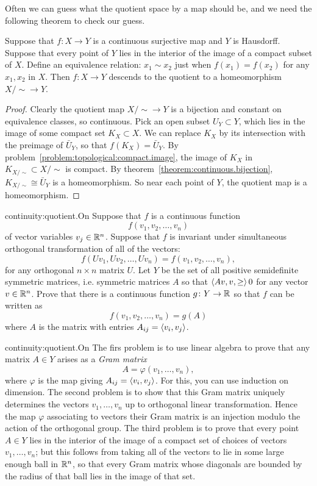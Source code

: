 Often we can guess what the quotient space by a map should be, and we need the following theorem to check our guess.
\begin{theorem}
Suppose that \(f \colon X \to Y\) is a continuous surjective map and \(Y\) is Hausdorff.
Suppose that every point of \(Y\) lies in the interior of the image of a compact subset of \(X\).
Define an equivalence relation: \(x_1 \sim x_2\) just when \(f(x_1)=f(x_2)\) for any \(x_1, x_2\) in \(X\).
Then \(f \colon X \to Y\) descends to the quotient to a homeomorphism \(X/{\sim} \to Y\).
\end{theorem}
\begin{proof}
Clearly the quotient map \(X/{\sim} \to Y\) is a bijection and constant on equivalence classes, so continuous.
Pick an open subset \(U_Y \subset Y\), which lies in the image of some compact set \(K_X \subset X\).
We can replace \(K_X\) by its intersection with the preimage of \(\bar{U}_Y\), so that \(f(K_X)=\bar{U}_Y\).
By problem~\vref{problem:topological:compact.image}, the image of \(K_X\) in \(K_{X/{\sim}} \subset X/{\sim}\) is compact.
By theorem~\vref{theorem:continuous.bijection}, \(K_{X/{\sim}} \cong \bar{U}_Y\) is a homeomorphism.
So near each point of \(Y\), the quotient map is a homeomorphism.
\end{proof}
\begin{problem*}{continuity:quotient.On}
Suppose that \(f\) is a continuous function
\[
f(v_1,v_2,\dots,v_n)
\]
of vector variables \(v_j\in\mathbb{R}^{n}\).
Suppose that \(f\) is invariant under simultaneous orthogonal transformation of all of the vectors:
\[
f(Uv_1,Uv_2,\dots,Uv_n)=f(v_1,v_2,\dots,v_n),
\]
for any orthogonal \(n\times n\) matrix \(U\).
Let \(Y\) be the set of all positive semidefinite symmetric matrices, i.e. symmetric matrices \(A\) so that \(\left<Av,v,\ge\right> 0\) for any vector \(v\in\mathbb{R}^{n}\).
Prove that there is a continuous function \(g\colon Y \to\mathbb{R}^{}\) so that \(f\) can be written as 
\[
f(v_1,v_2,\dots,v_n)=g(A)
\]
where \(A\) is the matrix with entries \(A_{ij}=\left<v_i,v_j\right>\).
\end{problem*}
\begin{answer}{continuity:quotient.On}
The firs problem is to use linear algebra to prove that any matrix \(A\in Y\) arises as a \emph{Gram matrix}
\[
A=\varphi(v_1,\dots,v_n),
\]
where \(\varphi\) is the map giving \(A_{ij}=\left<v_i,v_j\right>\).
For this, you can use induction on dimension.
The second problem is to show that this Gram matrix uniquely determines the vectors \(v_1,\dots,v_n\) up to orthogonal linear transformation.
Hence the map \(\varphi\) associating to vectors their Gram matrix is an injection modulo the action of the orthogonal group.
The third problem is to prove that every point \(A\in Y\) lies in the interior of the image of a compact set of choices of vectors \(v_1,\dots,v_n\); but this follows from taking all of the vectors to lie in some large enough ball in \(\mathbb{R}^{n}\), so that every Gram matrix whose diagonals are bounded by the radius of that ball lies in the image of that set.
\end{answer}
